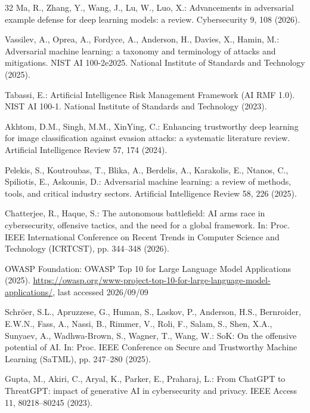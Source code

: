 \documentclass[runningheads]{llncs}
\begin{document}
\begin{thebibliography}{32}
Ma, R., Zhang, Y., Wang, J., Lu, W., Luo, X.: Advancements in adversarial example defense for deep learning models: a review. Cybersecurity 9, 108 (2026). 

Vassilev, A., Oprea, A., Fordyce, A., Anderson, H., Davies, X., Hamin, M.: Adversarial machine learning: a taxonomy and terminology of attacks and mitigations. NIST AI 100-2e2025. National Institute of Standards and Technology (2025). 

Tabassi, E.: Artificial Intelligence Risk Management Framework (AI RMF 1.0). NIST AI 100-1. National Institute of Standards and Technology (2023). 

Akhtom, D.M., Singh, M.M., XinYing, C.: Enhancing trustworthy deep learning for image classification against evasion attacks: a systematic literature review. Artificial Intelligence Review 57, 174 (2024). 

Pelekis, S., Koutroubas, T., Blika, A., Berdelis, A., Karakolis, E., Ntanos, C., Spiliotis, E., Askounis, D.: Adversarial machine learning: a review of methods, tools, and critical industry sectors. Artificial Intelligence Review 58, 226 (2025). 

Chatterjee, R., Haque, S.: The autonomous battlefield: AI arms race in cybersecurity, offensive tactics, and the need for a global framework. In: Proc. IEEE International Conference on Recent Trends in Computer Science and Technology (ICRTCST), pp. 344--348 (2026). 

OWASP Foundation: OWASP Top 10 for Large Language Model Applications (2025). \url{https://owasp.org/www-project-top-10-for-large-language-model-applications/}, last accessed 2026/09/09

Schr\"oer, S.L., Apruzzese, G., Human, S., Laskov, P., Anderson, H.S., Bernroider, E.W.N., Fass, A., Nassi, B., Rimmer, V., Roli, F., Salam, S., Shen, X.A., Sunyaev, A., Wadhwa-Brown, S., Wagner, T., Wang, W.: SoK: On the offensive potential of AI. In: Proc. IEEE Conference on Secure and Trustworthy Machine Learning (SaTML), pp. 247--280 (2025). 

Gupta, M., Akiri, C., Aryal, K., Parker, E., Praharaj, L.: From ChatGPT to ThreatGPT: impact of generative AI in cybersecurity and privacy. IEEE Access 11, 80218--80245 (2023). 


\end{thebibliography}
\end{document}
